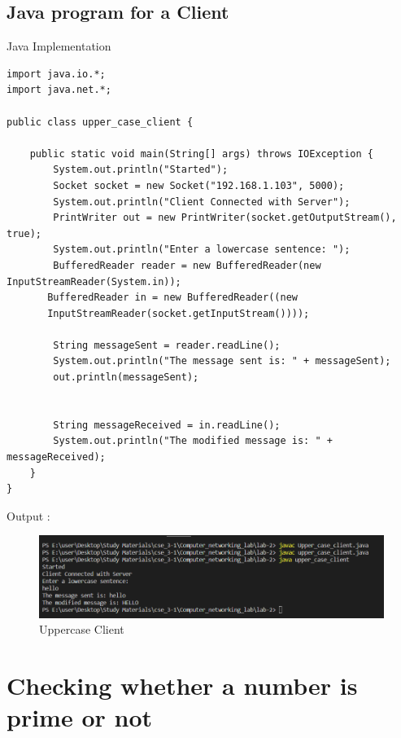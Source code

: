 \documentclass[11pt]{article}
\begin{document}
\subsection{Java program for a Client}
Java Implementation \\[2pt]
\begin{verbatim}
import java.io.*;
import java.net.*;

public class upper_case_client {

    public static void main(String[] args) throws IOException {
        System.out.println("Started");
        Socket socket = new Socket("192.168.1.103", 5000);
        System.out.println("Client Connected with Server");
        PrintWriter out = new PrintWriter(socket.getOutputStream(), true);
        System.out.println("Enter a lowercase sentence: ");
        BufferedReader reader = new BufferedReader(new InputStreamReader(System.in));
       BufferedReader in = new BufferedReader((new 
       InputStreamReader(socket.getInputStream())));

        String messageSent = reader.readLine();
        System.out.println("The message sent is: " + messageSent);
        out.println(messageSent);


        String messageReceived = in.readLine();
        System.out.println("The modified message is: " + messageReceived);
    }
}
\end{verbatim}


 Output : 
\begin{figure}[!h]
\centering
\includegraphics[width=\textwidth]{upper_client.png}
\caption{Uppercase Client}
\end{figure}
\FloatBarrier

\section{Checking whether a number is prime or not}
\end{document}
